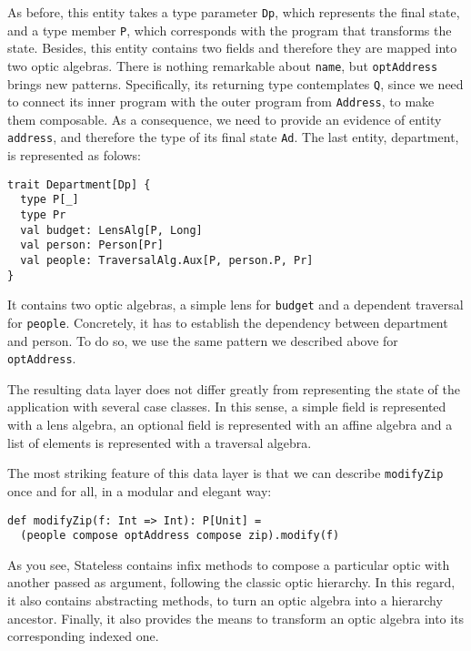 \documentclass[preview, 3p]{elsarticle}
\begin{document}
As before, this entity takes a type parameter \lstinline{Dp}, which represents
the final state, and a type member \lstinline{P}, which corresponds with the
program that transforms the state. Besides, this entity contains two fields and
therefore they are mapped into two optic algebras. There is nothing remarkable
about \lstinline{name}, but \lstinline{optAddress} brings new patterns.
Specifically, its returning type contemplates \lstinline{Q}, since we need to
connect its inner program with the outer program from \lstinline{Address}, to
make them composable. As a consequence, we need to provide an evidence of entity
\lstinline{address}, and therefore the type of its final state \lstinline{Ad}.
The last entity, department, is represented as folows:

\begin{lstlisting}
trait Department[Dp] {
  type P[_]
  type Pr
  val budget: LensAlg[P, Long]
  val person: Person[Pr]
  val people: TraversalAlg.Aux[P, person.P, Pr]
}
\end{lstlisting}

It contains two optic algebras, a simple lens for \lstinline{budget} and a
dependent traversal for \lstinline{people}. Concretely, it has to establish the
dependency between department and person. To do so, we use the same pattern we
described above for \lstinline{optAddress}.

The resulting data layer does not differ greatly from representing the state of
the application with several case classes. In this sense, a simple field is
represented with a lens algebra, an optional field is represented with an affine
algebra and a list of elements is represented with a traversal algebra.

The most striking feature of this data layer is that we can describe
\lstinline{modifyZip} once and for all, in a modular and elegant way:

\begin{lstlisting}
def modifyZip(f: Int => Int): P[Unit] =
  (people compose optAddress compose zip).modify(f)
\end{lstlisting}

As you see, Stateless contains infix methods to compose a particular optic with
another passed as argument, following the classic optic hierarchy. In this
regard, it also contains abstracting methods, to turn an optic algebra into a
hierarchy ancestor. Finally, it also provides the means to transform an optic
algebra into its corresponding indexed one.
\end{document}
